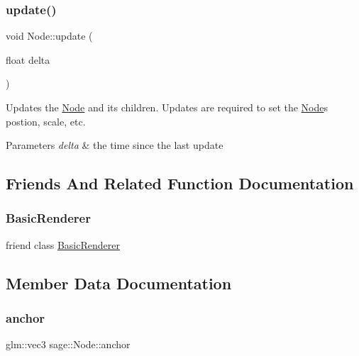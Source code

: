 \subsubsection{\texorpdfstring{update()}{update()}}
{\footnotesize\ttfamily void Node\+::update (\begin{DoxyParamCaption}\item[{float}]{delta }\end{DoxyParamCaption})\hspace{0.3cm}{\ttfamily [virtual]}}



Updates the \mbox{\hyperlink{classsage_1_1Node}{Node}} and its children. Updates are required to set the \mbox{\hyperlink{classsage_1_1Node}{Node}}\textquotesingle{}s postion, scale, etc. 


\begin{DoxyParams}{Parameters}
{\em delta} & the time since the last update \\
\hline
\end{DoxyParams}


\subsection{Friends And Related Function Documentation}
\mbox{\label{classsage_1_1Node_a2e3d7a9693f494564454ce2b99aa59ab}} 
\subsubsection{\texorpdfstring{BasicRenderer}{BasicRenderer}}
{\footnotesize\ttfamily friend class \mbox{\hyperlink{classsage_1_1BasicRenderer}{Basic\+Renderer}}\hspace{0.3cm}{\ttfamily [friend]}}



\subsection{Member Data Documentation}
\mbox{\label{classsage_1_1Node_a8698d732514fa2caba0ccee46dbae17a}} 
\subsubsection{\texorpdfstring{anchor}{anchor}}
{\footnotesize\ttfamily glm\+::vec3 sage\+::\+Node\+::anchor\hspace{0.3cm}{\ttfamily [protected]}}

